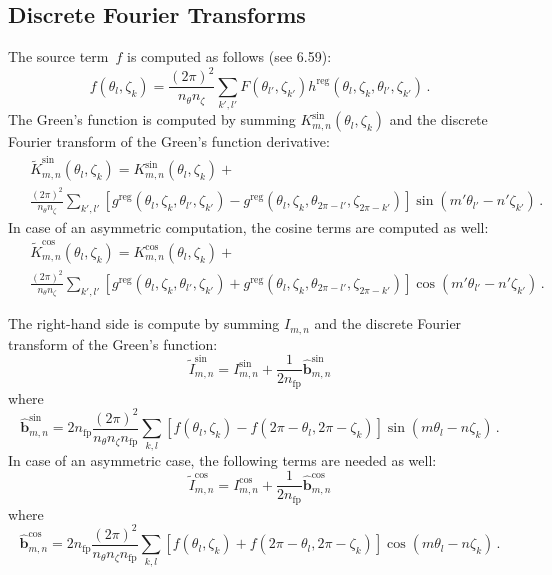 \subsection{Discrete Fourier Transforms}
The source term~$f$ is computed as follows (see 6.59): %
\begin{equation}
 f(\theta_l, \zeta_k)
 = \frac{(2 \pi)^2}{n_\theta n_\zeta}
   \sum\limits_{k', l'}
     F(\theta_{l'}, \zeta_{k'}) h^\textrm{reg}(\theta_l, \zeta_k, \theta_{l'}, \zeta_{k'}) \, .
\end{equation}
The Green's function is computed by summing $K^\textrm{sin}_{m,n}(\theta_l, \zeta_k)$
and the discrete Fourier transform of the Green's function derivative:
\begin{align}
 ~&\, \tilde{K}^\textrm{sin}_{m,n}(\theta_l, \zeta_k)
 = K^\textrm{sin}_{m,n}(\theta_l, \zeta_k) + \nonumber \\
 ~&\, \frac{(2 \pi)^2}{n_\theta n_\zeta}
   \sum\limits_{k', l'}
     \left[   g^\textrm{reg}(\theta_l, \zeta_k, \theta_{        l'}, \zeta_{        k'})
            - g^\textrm{reg}(\theta_l, \zeta_k, \theta_{2 \pi - l'}, \zeta_{2 \pi - k'}) \right]
     \sin(m' \theta_{l'} - n' \zeta_{k'}) \, .
\end{align}
In case of an asymmetric computation, the cosine terms are computed as well:
\begin{align}
 ~&\, \tilde{K}^\textrm{cos}_{m,n}(\theta_l, \zeta_k)
 = K^\textrm{cos}_{m,n}(\theta_l, \zeta_k) + \nonumber \\
 ~&\, \frac{(2 \pi)^2}{n_\theta n_\zeta}
   \sum\limits_{k', l'}
     \left[   g^\textrm{reg}(\theta_l, \zeta_k, \theta_{        l'}, \zeta_{        k'})
            + g^\textrm{reg}(\theta_l, \zeta_k, \theta_{2 \pi - l'}, \zeta_{2 \pi - k'}) \right]
     \cos(m' \theta_{l'} - n' \zeta_{k'}) \, .
\end{align}

The right-hand side is compute by summing $I_{m,n}$
and the discrete Fourier transform of the Green's function:
\begin{equation}
 \tilde{I}^\textrm{sin}_{m,n}
 = I^\textrm{sin}_{m,n}
   + \frac{1}{2 n_\textrm{fp}} \hat{\mathbf{b}}^\textrm{sin}_{m, n}
\end{equation}
where
\begin{equation}
 \hat{\mathbf{b}}^\textrm{sin}_{m, n}
 = 2 n_\textrm{fp} \frac{(2 \pi)^2}{n_\theta n_\zeta n_\textrm{fp}}
   \sum\limits_{k, l}
     \left[ f(\theta_l, \zeta_k) - f(2 \pi - \theta_l, 2 \pi - \zeta_k) \right] \sin(m \theta_l - n \zeta_k) \, .
\end{equation}
In case of an asymmetric case, the following terms are needed as well:
\begin{equation}
 \tilde{I}^\textrm{cos}_{m,n}
 = I^\textrm{cos}_{m,n}
   + \frac{1}{2 n_\textrm{fp}} \hat{\mathbf{b}}^\textrm{cos}_{m, n}
\end{equation}
where
\begin{equation}
 \hat{\mathbf{b}}^\textrm{cos}_{m, n}
 = 2 n_\textrm{fp} \frac{(2 \pi)^2}{n_\theta n_\zeta n_\textrm{fp}}
   \sum\limits_{k, l}
     \left[ f(\theta_l, \zeta_k) + f(2 \pi - \theta_l, 2 \pi - \zeta_k) \right] \cos(m \theta_l - n \zeta_k) \, .
\end{equation}

